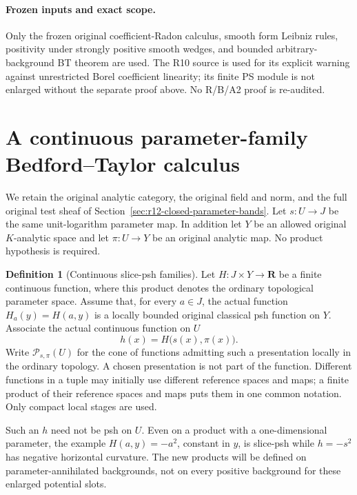 \documentclass[11pt,a4paper]{article}
\numberwithin{equation}{section}
\theoremstyle{definition}
\newtheorem{definition}[theorem]{Definition}
\theoremstyle{remark}
\begin{document}
\paragraph{Frozen inputs and exact scope.}
Only the frozen original coefficient-Radon calculus, smooth form
Leibniz rules, positivity under strongly positive smooth wedges,
and bounded arbitrary-background BT theorem are used. The R10
source 
is used for its explicit warning against unrestricted Borel
coefficient linearity; its finite PS module is not enlarged
without the separate proof above. No R/B/A2 proof is re-audited.



\section{A continuous parameter-family Bedford--Taylor calculus}
\label{sec:r12-parameter-family-bt}

We retain the original analytic category, the original field and norm,
and the full original test sheaf of
Section~\ref{sec:r12-closed-parameter-bands}. Let $s:U\to J$ be the
same unit-logarithm parameter map. In addition let $Y$ be an allowed
original $K$-analytic space and let $\pi:U\to Y$ be an original
analytic map. No product hypothesis is required.

\begin{definition}[Continuous slice-psh families]
\label{def:r12-continuous-slice-psh}
Let $H:J\times Y\to\mathbf R$ be a finite continuous function,
where this product denotes the ordinary topological parameter space.
Assume that, for every $a\in J$, the actual function
$H_a(y)=H(a,y)$ is a locally bounded original classical psh function
on $Y$. Associate the actual continuous function on $U$
\[
                      h(x)=H\bigl(s(x),\pi(x)\bigr).
 \tag{PF1}
\]
Write $\mathcal P_{s,\pi}(U)$ for the cone of functions admitting
such a presentation locally in the ordinary topology. A chosen
presentation is not part of the function. Different functions in
a tuple may initially use different reference spaces and maps;
a finite product of their reference spaces and maps puts them in
one common notation. Only compact local stages are used.
\end{definition}

Such an $h$ need not be psh on $U$. Even on a product with a
one-dimensional parameter, the example $H(a,y)=-a^2$, constant in
$y$, is slice-psh while $h=-s^2$ has negative horizontal curvature.
The new products will be defined on parameter-annihilated backgrounds,
not on every positive background for these enlarged potential slots.
\end{document}
